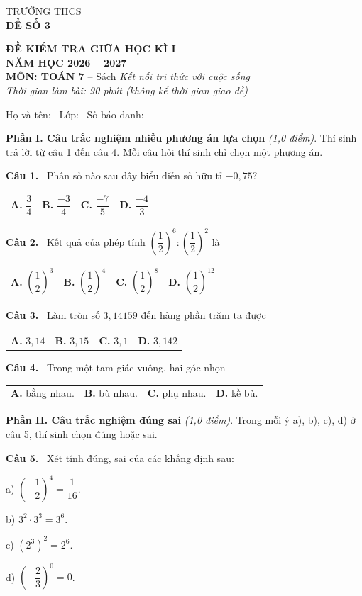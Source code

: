 \documentclass[12pt,a4paper]{article}
\makeatletter
\newcommand{\bonpa}[4]{\par\noindent\begin{tabularx}{\linewidth}{@{\hspace{0.6cm}}XXXX@{}}
\textbf{A.} #1 & \textbf{B.} #2 & \textbf{C.} #3 & \textbf{D.} #4\end{tabularx}\par}
\newcommand{\cau}[1]{\par\medskip\textbf{Câu #1.}~}
\newcommand{\y}[1]{\par\hspace*{0.6cm}#1}
\newcommand{\phan}[1]{\par\bigskip{\large\textbf{#1}}\par\smallskip}
\makeatother
\begin{document}
\noindent
\begin{minipage}[t]{0.38\linewidth}\centering
TRƯỜNG THCS \dotfill\\[2pt]
\textbf{ĐỀ SỐ 3}
\end{minipage}\hfill
\begin{minipage}[t]{0.6\linewidth}\centering
\textbf{ĐỀ KIỂM TRA GIỮA HỌC KÌ I}\\
\textbf{NĂM HỌC 2026 -- 2027}\\
\textbf{MÔN: TOÁN 7} -- Sách \textit{Kết nối tri thức với cuộc sống}\\
\textit{Thời gian làm bài: 90 phút (không kể thời gian giao đề)}
\end{minipage}

\medskip
Họ và tên: \dotfill\ Lớp: \makebox[2cm]{\dotfill}\ Số báo danh: \makebox[2.5cm]{\dotfill}
\phan{A. TRẮC NGHIỆM (3,0 điểm)}
\textbf{Phần I. Câu trắc nghiệm nhiều phương án lựa chọn} \textit{(1,0 điểm)}. Thí sinh trả lời từ câu 1 đến câu 4. Mỗi câu hỏi thí sinh chỉ chọn một phương án.
\cau{1} Phân số nào sau đây biểu diễn số hữu tỉ $-0{,}75$?
\bonpa{$\dfrac{3}{4}$}{$\dfrac{-3}{4}$}{$\dfrac{-7}{5}$}{$\dfrac{-4}{3}$}
\cau{2} Kết quả của phép tính $\left(\dfrac{1}{2}\right)^{6}:\left(\dfrac{1}{2}\right)^{2}$ là
\bonpa{$\left(\dfrac{1}{2}\right)^{3}$}{$\left(\dfrac{1}{2}\right)^{4}$}{$\left(\dfrac{1}{2}\right)^{8}$}{$\left(\dfrac{1}{2}\right)^{12}$}
\cau{3} Làm tròn số $3{,}14159$ đến hàng phần trăm ta được
\bonpa{$3{,}14$}{$3{,}15$}{$3{,}1$}{$3{,}142$}
\cau{4} Trong một tam giác vuông, hai góc nhọn
\bonpa{bằng nhau.}{bù nhau.}{phụ nhau.}{kề bù.}

\medskip\textbf{Phần II. Câu trắc nghiệm đúng sai} \textit{(1,0 điểm)}. Trong mỗi ý a), b), c), d) ở câu 5, thí sinh chọn đúng hoặc sai.
\cau{5} Xét tính đúng, sai của các khẳng định sau:
\y{a) $\left(-\dfrac{1}{2}\right)^{4}=\dfrac{1}{16}$.}
\y{b) $3^{2}\cdot 3^{3}=3^{6}$.}
\y{c) $\left(2^{3}\right)^{2}=2^{6}$.}
\y{d) $\left(-\dfrac{2}{3}\right)^{0}=0$.}
\end{document}
